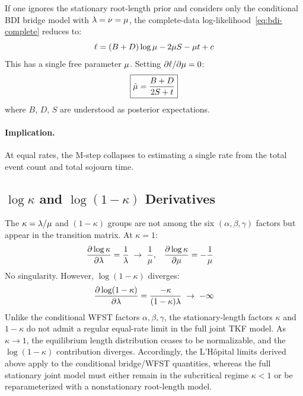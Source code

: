 If one ignores the stationary root-length prior and considers only the conditional BDI bridge model with $\lambda = \nu = \mu$,
the complete-data log-likelihood~\eqref{eq:bdi-complete} reduces to:
\[
\ell = (B + D)\log\mu - 2\mu S - \mu t + c
\]
This has a single free parameter $\mu$.
Setting $\partial\ell/\partial\mu = 0$:
\begin{equation}
\boxed{\hat{\mu} = \frac{B + D}{2S + t}}
\label{eq:mu-mle-equal}
\end{equation}
where $B$, $D$, $S$ are understood as posterior expectations.

\paragraph{Implication.}
At equal rates, the M-step collapses to estimating a single rate
from the total event count and total sojourn time.


\subsection{\texorpdfstring{$\log\kappa$ and $\log(1{-}\kappa)$ Derivatives}{log kappa and log(1-kappa) Derivatives}}

The $\kappa = \lambda/\mu$ and $(1{-}\kappa)$ groups
are not among the six $(\alpha,\beta,\gamma)$ factors but
appear in the transition matrix.
At $\kappa = 1$:
\begin{align*}
\frac{\partial\log\kappa}{\partial\lambda} &= \frac{1}{\lambda}
  \;\to\; \frac{1}{\mu}, &
\frac{\partial\log\kappa}{\partial\mu} &= -\frac{1}{\mu}
\end{align*}
No singularity.  However, $\log(1{-}\kappa)$ diverges:
\[
\frac{\partial\log(1-\kappa)}{\partial\lambda}
= \frac{-\kappa}{(1-\kappa)\lambda}
\;\to\; -\infty
\]
Unlike the conditional WFST factors $\alpha,\beta,\gamma$, the stationary-length factors $\kappa$ and $1-\kappa$ do not admit a regular equal-rate limit in the full joint TKF model.
As $\kappa \to 1$, the equilibrium length distribution ceases to be normalizable, and the $\log(1-\kappa)$ contribution diverges.
Accordingly, the L'Hôpital limits derived above apply to the conditional bridge/WFST quantities, whereas the full stationary joint model must either remain in the subcritical regime $\kappa < 1$
or be reparameterized with a nonstationary root-length model.




